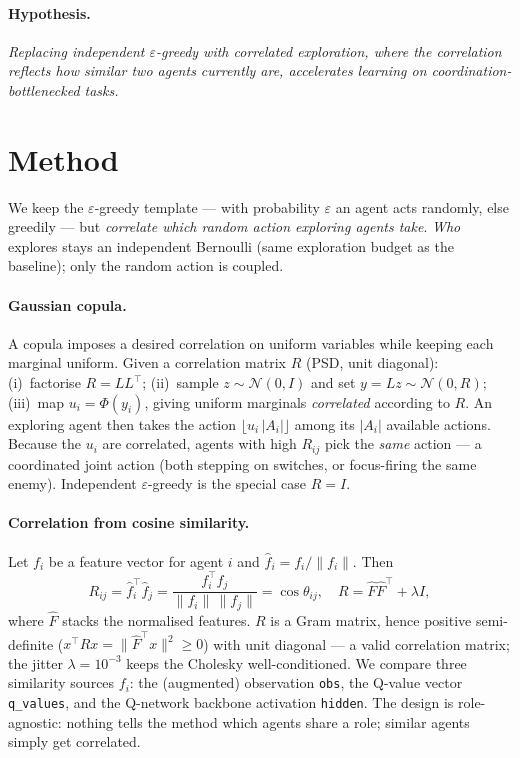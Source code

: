 \documentclass[10pt,twocolumn]{article}
\newcommand{\eps}{\varepsilon}
\newcommand{\obs}{\texttt{obs}}
\newcommand{\qv}{\texttt{q\_values}}
\newcommand{\hid}{\texttt{hidden}}
\begin{document}
\paragraph{Hypothesis.} \emph{Replacing independent $\eps$-greedy with correlated
exploration, where the correlation reflects how similar two agents currently are,
accelerates learning on coordination-bottlenecked tasks.}

\section{Method}
We keep the $\eps$-greedy template --- with probability $\eps$ an agent acts
randomly, else greedily --- but \emph{correlate which random action exploring
agents take}. \emph{Who} explores stays an independent Bernoulli (same
exploration budget as the baseline); only the random action is coupled.

\paragraph{Gaussian copula.} A copula imposes a desired correlation on uniform
variables while keeping each marginal uniform. Given a correlation matrix $R$
(PSD, unit diagonal): (i)~factorise $R=LL^\top$; (ii)~sample
$z\sim\mathcal{N}(0,I)$ and set $y=Lz\sim\mathcal{N}(0,R)$; (iii)~map
$u_i=\Phi(y_i)$, giving uniform marginals \emph{correlated} according to $R$. An
exploring agent then takes the action $\lfloor u_i\,|A_i|\rfloor$ among its
$|A_i|$ available actions. Because the $u_i$ are correlated, agents with high
$R_{ij}$ pick the \emph{same} action --- a coordinated joint action (both stepping
on switches, or focus-firing the same enemy). Independent $\eps$-greedy is the
special case $R=I$.

\paragraph{Correlation from cosine similarity.} Let $f_i$ be a feature vector for
agent $i$ and $\hat f_i = f_i/\lVert f_i\rVert$. Then
\begin{equation}
R_{ij}=\hat f_i^\top \hat f_j=\frac{f_i^\top f_j}{\lVert f_i\rVert\,\lVert f_j\rVert}=\cos\theta_{ij},
\quad R=\hat F\hat F^\top+\lambda I,
\end{equation}
where $\hat F$ stacks the normalised features. $R$ is a Gram matrix, hence
positive semi-definite ($x^\top R x=\lVert\hat F^\top x\rVert^2\ge 0$) with unit
diagonal --- a valid correlation matrix; the jitter $\lambda=10^{-3}$ keeps the
Cholesky well-conditioned. We compare three similarity sources $f_i$: the
(augmented) observation \obs, the Q-value vector \qv, and the Q-network backbone
activation \hid. The design is role-agnostic: nothing tells the method which
agents share a role; similar agents simply get correlated.
\end{document}

